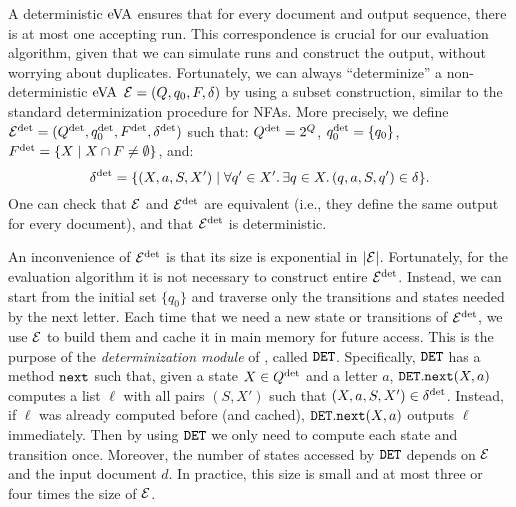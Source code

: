 A deterministic $\mathrm{eVA}$ ensures that for every document and output sequence,
there is at most one accepting run. This correspondence is crucial for our
evaluation algorithm, given that we can simulate runs and construct the output,
without worrying about duplicates. Fortunately, we can always ``determinize'' a
non-deterministic $\mathrm{eVA}$ $\mathcal{E} = (Q, q_0, F, \delta)$ by using a subset
construction, similar to the standard determinization procedure for NFAs. More
precisely, we define $\mathcal{E}^{{\operatorname{det}}} = (Q^{{\operatorname{det}}}, q_0^{{\operatorname{det}}}, F^{{\operatorname{det}}},
\delta^{{\operatorname{det}}})$ such that: $Q^{{\operatorname{det}}} = 2^Q$, $q_0^{{\operatorname{det}}} = \{q_0\}$,
$F^{{\operatorname{det}}} = \{X \mid X \cap F \neq \emptyset\}$, and:
$$
	\delta^{{\operatorname{det}}} = \{(X, a, S, X') \mid \forall q' \in X'. \, \exists q \in X. \, (q, a, S, q') \in \delta\}.
$$
One can check that $\mathcal{E}$ and $\mathcal{E}^{{\operatorname{det}}}$ are equivalent (i.e., they define the
same output for every document), and that $\mathcal{E}^{{\operatorname{det}}}$ is deterministic.

An inconvenience of $\mathcal{E}^{{\operatorname{det}}}$ is that its size is exponential in $|\mathcal{E}|$.
Fortunately, for the evaluation algorithm it is not necessary to construct
entire $\mathcal{E}^{{\operatorname{det}}}$. Instead, we can start from the initial set $\{q_0\}$ and
traverse only the transitions and states needed by the next letter. Each time
that we need a new state or transitions of $\mathcal{E}^{{\operatorname{det}}}$, we use $\mathcal{E}$ to build
them and cache it in main memory for future access. This is the purpose of the
\emph{determinization module} of \rematch, called $\mathtt{DET}$. Specifically, $\mathtt{DET}$
has a method $\texttt{next}$ such that, given a state $X \in Q^{\operatorname{det}}$ and a letter
$a$, $\mathtt{DET}.\texttt{next}(X, a)$ computes a list $\ell$ with all pairs $(S, X')$
such that $(X,a,S,X') \in \delta^{\operatorname{det}}$. Instead, if $\ell$ was already computed
before (and cached), $\mathtt{DET}.\texttt{next}(X, a)$ outputs $\ell$ immediately. Then by
using $\mathtt{DET}$ we only need to compute each state and transition once. Moreover,
the number of states accessed by $\mathtt{DET}$ depends on $\mathcal{E}$ and the input document
$d$. In practice, this size is small and at most three or four times the size of
$\mathcal{E}$.

